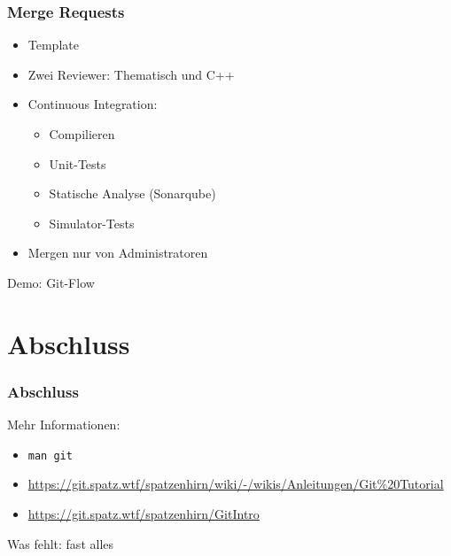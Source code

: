 \documentclass[aspectratio=169]{beamer}
\begin{document}
\begin{frame}
    \frametitle{Merge Requests}
    \begin{itemize}
        \item Template
            \pause
        \item Zwei Reviewer: Thematisch und C++
            \pause
        \item Continuous Integration:
            \pause
            \begin{itemize}
                \item Compilieren
                    \pause 
                \item Unit-Tests
                    \pause
                \item Statische Analyse (Sonarqube)
                    \pause
                \item Simulator-Tests
            \end{itemize}
            \pause
        \item Mergen nur von Administratoren
    \end{itemize}
\end{frame}

\begin{frame}
    \Huge{Demo: Git-Flow}
\end{frame}

\section{Abschluss}
\begin{frame}
    \frametitle{Abschluss}
    {\Large Mehr Informationen:}
    \begin{itemize}
        \item \lstinline{man git}
            \pause
        \item \url{https://git.spatz.wtf/spatzenhirn/wiki/-/wikis/Anleitungen/Git\%20Tutorial}
            \pause
        \item \url{https://git.spatz.wtf/spatzenhirn/GitIntro}
    \end{itemize}
    \pause

    \vspace{1cm}

    {\Large Was fehlt: \pause fast alles}
\end{frame}
\end{document}
